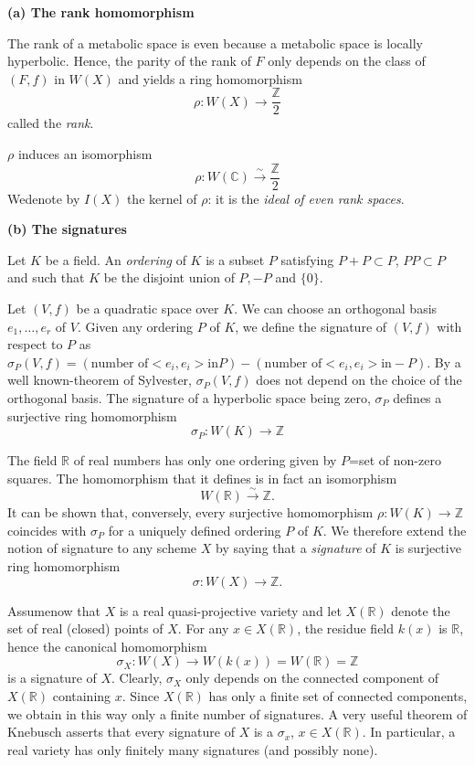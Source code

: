 \eject

\noindent
\textbf{(a) The rank homomorphism}

The rank of a metabolic space is even because a metabolic space is locally hyperbolic. Hence, the parity of the rank of $F$ only depends on the class of $(F,f)$ in $W(X)$ and yields a ring homomorphism 
$$
\rho:W(X)\to \dfrac{\mathbb{Z}}{2}
$$
called the \textit{rank}.

\begin{EXP}
$\rho$ induces an isomorphism 
$$
\rho:W(\mathbb{C})\xrightarrow{\sim} \dfrac{\mathbb{Z}}{2}
$$
We\pageoriginale denote by $I(X)$ the kernel of $\rho$: it is the \textit{ideal of even rank spaces}.
\end{EXP}

\medskip
\noindent
\textbf{(b) The signatures}

Let $K$ be a field. An \textit{ordering} of $K$ is a subset $P$ satisfying $P+P\subset P$, $PP\subset P$ and such that $K$ be the disjoint union of $P,-P$ and $\{0\}$. 

Let $(V,f)$ be a quadratic space over $K$. We can choose an orthogonal basis $e_1,\ldots,e_r$ of $V$. Given any ordering $P$ of $K$, we define the signature of $(V,f)$ with respect to $P$ as $\sigma_P(V,f)= (\text{number of}<e_i,e_i> \text{in} P)-(\text{number of} <e_i,e_i> \text{in} -P)$. By a well known-theorem of Sylvester, $\sigma_P(V,f)$ does not depend on the choice of the orthogonal basis. The signature of a hyperbolic space being zero, $\sigma_P$ defines a surjective ring homomorphism 
$$
\sigma_P:W(K)\to \mathbb{Z}
$$  

\begin{EXP}
The field $\mathbb{R}$ of real numbers has only one ordering given by $P$=set of non-zero squares. The homomorphism that it defines is in fact an isomorphism 
$$
W(\mathbb{R})\xrightarrow{\sim} \mathbb{Z}.
$$
It can be shown that, conversely, every surjective homomorphism $\rho:W(K)\to\mathbb{Z}$ coincides with $\sigma_P$ for a uniquely defined ordering $P$ of $K$. We therefore extend the notion of signature to any scheme $X$ by saying that a \textit{signature} of $K$ is surjective ring homomorphism 
$$
\sigma:W(X)\to \mathbb{Z}.
$$
\end{EXP}

Assume\pageoriginale now that $X$ is a real quasi-projective variety and let $X(\mathbb{R})$ denote the set of real (closed) points of $X$. For any $x\in X(\mathbb{R})$, the residue field $k(x)$ is $\mathbb{R}$, hence the canonical homomorphism 
$$
\sigma_X:W(X)\to W(k(x))=W(\mathbb{R})=\mathbb{Z}
$$
is a signature of $X$. Clearly, $\sigma_X$ only depends on the connected component of $X(\mathbb{R})$ containing $x$. Since $X(\mathbb{R})$ has only a finite set of connected components, we obtain in this way only a finite number of signatures. A very useful theorem of Knebusch \cite{key10} asserts that every signature of $X$ is a $\sigma_x$, $x\in X(\mathbb{R})$. In particular, a real variety has only finitely many signatures (and possibly none).

